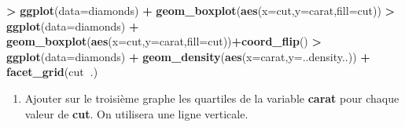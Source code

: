 \documentclass[]{book}
\newenvironment{Shaded}{\begin{snugshade}}{\end{snugshade}}
\newcommand{\DataTypeTok}[1]{\textcolor[rgb]{0.13,0.29,0.53}{#1}}
\newcommand{\KeywordTok}[1]{\textcolor[rgb]{0.13,0.29,0.53}{\textbf{#1}}}
\newcommand{\NormalTok}[1]{#1}
\newcommand{\OperatorTok}[1]{\textcolor[rgb]{0.81,0.36,0.00}{\textbf{#1}}}
\newcommand{\StringTok}[1]{\textcolor[rgb]{0.31,0.60,0.02}{#1}}
\providecommand{\tightlist}{%
  \setlength{\itemsep}{0pt}\setlength{\parskip}{0pt}}
\theoremstyle{definition}
\theoremstyle{definition}
\theoremstyle{definition}
\theoremstyle{remark}
\begin{document}
\begin{Shaded}
\begin{Highlighting}[]
\OperatorTok{>}\StringTok{ }\KeywordTok{ggplot}\NormalTok{(}\DataTypeTok{data=}\NormalTok{diamonds) }\OperatorTok{+}\StringTok{ }\KeywordTok{geom_boxplot}\NormalTok{(}\KeywordTok{aes}\NormalTok{(}\DataTypeTok{x=}\NormalTok{cut,}\DataTypeTok{y=}\NormalTok{carat,}\DataTypeTok{fill=}\NormalTok{cut)) }
\OperatorTok{>}\StringTok{ }\KeywordTok{ggplot}\NormalTok{(}\DataTypeTok{data=}\NormalTok{diamonds) }\OperatorTok{+}\StringTok{ }\KeywordTok{geom_boxplot}\NormalTok{(}\KeywordTok{aes}\NormalTok{(}\DataTypeTok{x=}\NormalTok{cut,}\DataTypeTok{y=}\NormalTok{carat,}\DataTypeTok{fill=}\NormalTok{cut))}\OperatorTok{+}\KeywordTok{coord_flip}\NormalTok{()}
\OperatorTok{>}\StringTok{ }\KeywordTok{ggplot}\NormalTok{(}\DataTypeTok{data=}\NormalTok{diamonds) }\OperatorTok{+}\StringTok{ }\KeywordTok{geom_density}\NormalTok{(}\KeywordTok{aes}\NormalTok{(}\DataTypeTok{x=}\NormalTok{carat,}\DataTypeTok{y=}\NormalTok{..density..)) }\OperatorTok{+}\StringTok{  }\KeywordTok{facet_grid}\NormalTok{(cut}\OperatorTok{~}\NormalTok{.)}
\end{Highlighting}
\end{Shaded}

\begin{enumerate}
\def\labelenumi{\arabic{enumi}.}
\setcounter{enumi}{1}
\tightlist
\item
  Ajouter sur le troisième graphe les quartiles de la variable \textbf{carat} pour chaque valeur de \textbf{cut}. On utilisera une ligne verticale.
\end{enumerate}
\end{document}
